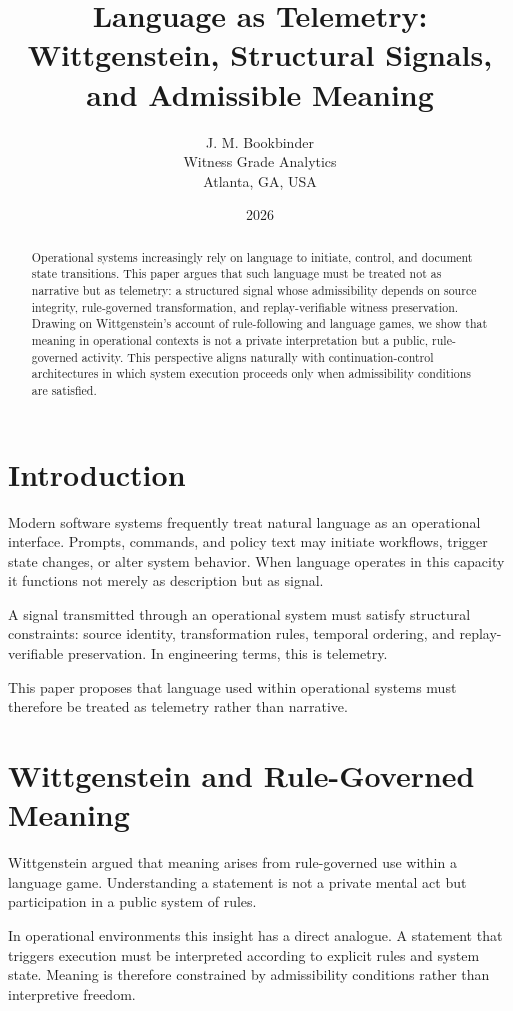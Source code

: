 \documentclass[11pt]{article}
\title{Language as Telemetry: Wittgenstein, Structural Signals, and Admissible Meaning}
\author{J. M. Bookbinder \\ Witness Grade Analytics \\ Atlanta, GA, USA}
\date{2026}
\begin{document}
\maketitle

\begin{abstract}
Operational systems increasingly rely on language to initiate, control, and document state transitions. 
This paper argues that such language must be treated not as narrative but as telemetry: a structured signal 
whose admissibility depends on source integrity, rule-governed transformation, and replay-verifiable witness preservation.
Drawing on Wittgenstein’s account of rule-following and language games, we show that meaning in operational contexts 
is not a private interpretation but a public, rule-governed activity. 
This perspective aligns naturally with continuation-control architectures in which system execution proceeds only when 
admissibility conditions are satisfied. 
\end{abstract}

\section{Introduction}

Modern software systems frequently treat natural language as an operational interface. 
Prompts, commands, and policy text may initiate workflows, trigger state changes, or alter system behavior. 
When language operates in this capacity it functions not merely as description but as signal.

A signal transmitted through an operational system must satisfy structural constraints:
source identity, transformation rules, temporal ordering, and replay-verifiable preservation. 
In engineering terms, this is telemetry.

This paper proposes that language used within operational systems must therefore be treated as telemetry rather than narrative.

\section{Wittgenstein and Rule-Governed Meaning}

Wittgenstein argued that meaning arises from rule-governed use within a language game. 
Understanding a statement is not a private mental act but participation in a public system of rules.

In operational environments this insight has a direct analogue. 
A statement that triggers execution must be interpreted according to explicit rules and system state. 
Meaning is therefore constrained by admissibility conditions rather than interpretive freedom.
\end{document}
